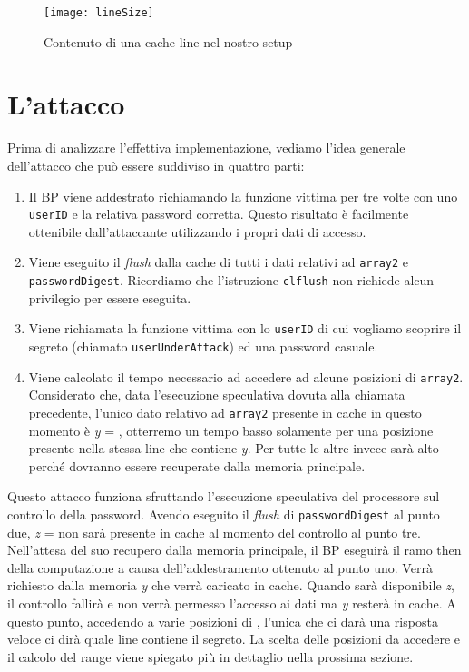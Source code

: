 		\begin{figure}
			\begin{center}
				\texttt{[image: lineSize]}
				\caption{Contenuto di una cache line nel nostro setup}
				\label{fig:lineSize}
			\end{center}
		\end{figure}
		
		\section{L'attacco}
			Prima di analizzare l'effettiva implementazione, vediamo l'idea generale dell'attacco che può essere suddiviso in quattro parti:
			
			\begin{enumerate}
				\item Il \ac{BP} viene addestrato richiamando la funzione vittima per tre volte con uno \texttt{userID} e la relativa password corretta. Questo risultato è facilmente ottenibile dall'attaccante utilizzando i propri dati di accesso.
				\item Viene eseguito il \emph{flush} dalla cache di tutti i dati relativi ad \texttt{array2} e \texttt{passwordDigest}. Ricordiamo che l'istruzione \texttt{clflush} non richiede alcun privilegio per essere eseguita.
				\item Viene richiamata la funzione vittima con lo \texttt{userID} di cui vogliamo scoprire il segreto (chiamato \texttt{userUnderAttack}) ed una password casuale.
				\item Viene calcolato il tempo necessario ad accedere ad alcune posizioni di \texttt{array2}. Considerato che, data l'esecuzione speculativa dovuta alla chiamata precedente, l'unico dato relativo ad \texttt{array2} presente in cache in questo momento è \emph{y} = , otterremo un tempo basso solamente per una posizione presente nella stessa line che contiene \emph{y}. Per tutte le altre invece sarà alto perché dovranno essere recuperate dalla memoria principale.
			\end{enumerate}
		
			Questo attacco funziona sfruttando l'esecuzione speculativa del processore sul controllo della password. Avendo eseguito il \emph{flush} di \texttt{passwordDigest} al punto due, \emph{z} =  non sarà presente in cache al momento del controllo al punto tre. Nell'attesa del suo recupero dalla memoria principale, il \ac{BP} eseguirà il ramo then della computazione a causa dell'addestramento ottenuto al punto uno. Verrà richiesto dalla memoria \emph{y} che verrà caricato in cache. Quando sarà disponibile \emph{z}, il controllo fallirà e non verrà permesso l'accesso ai dati ma \emph{y} resterà in cache. A questo punto, accedendo a varie posizioni di , l'unica che ci darà una risposta veloce ci dirà quale line contiene il segreto. La scelta delle posizioni da accedere e il calcolo del range viene spiegato più in dettaglio nella prossima sezione.
			
